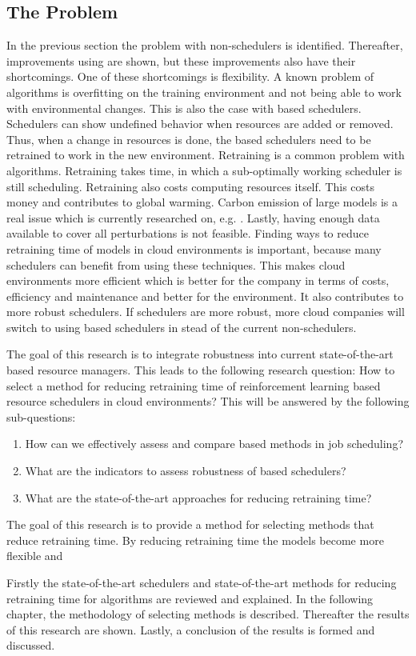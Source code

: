 \subsection{The Problem}

In the previous section the problem with non-\ai schedulers is identified.
Thereafter, improvements using \rl are shown, but these \rl improvements also
have their shortcomings. One of these shortcomings is flexibility. A known
problem of \ml algorithms is overfitting on the training environment and not
being able to work with environmental changes. This is also the case with \rl
based schedulers. Schedulers can show undefined behavior when resources are
added or removed. Thus, when a change in resources is done, the \rl based
schedulers need to be retrained to work in the new environment. Retraining is
a common problem with \ml algorithms. Retraining takes time, in which a
sub-optimally working scheduler is still scheduling. Retraining also costs
computing resources itself. This costs money and contributes to global
warming. Carbon emission of large \ml models is a real issue which is
currently researched on, e.g. . Lastly, having enough
data available to cover all perturbations is not feasible. Finding ways to
reduce retraining time of \rl models in cloud environments is important,
because many schedulers can benefit from using these techniques. This makes
cloud environments more efficient which is better for the company in terms of
costs, efficiency and maintenance and better for the environment. It also
contributes to more robust \rl schedulers. If \rl schedulers are more robust,
more cloud companies will switch to using \rl based schedulers in stead of the
current non-\ai schedulers.

The goal of this research is to integrate robustness into current
state-of-the-art \ml based resource managers. This leads to the following
research question: How to select a method for reducing retraining time of
reinforcement learning based resource schedulers in cloud environments? This
will be answered by the following sub-questions:

\begin{enumerate}
    \item How can we effectively assess and compare \rl based methods in job
        scheduling?
    \item What are the indicators to assess robustness of \rl based schedulers?
    \item What are the state-of-the-art approaches for reducing retraining time?
\end{enumerate}

The goal of this research is to provide a method for selecting methods that
reduce retraining time. By reducing retraining time the models become more
flexible and

Firstly the state-of-the-art \rl schedulers and state-of-the-art methods for
reducing retraining time for \rl algorithms are reviewed and explained. In the
following chapter, the methodology of selecting methods is described.
Thereafter the results of this research are shown. Lastly, a conclusion of the
results is formed and discussed.
